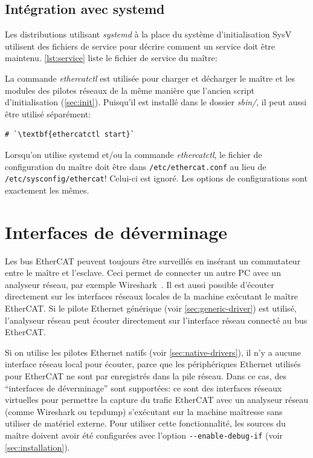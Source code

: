 \documentclass[a4paper,12pt,BCOR=6mm,bibtotoc,idxtotoc]{scrbook}
\begin{document}
\subsection{Int\'egration avec systemd}
\label{sec:systemd}

Les distributions utilisant \textit{systemd} \`a la place du syst\`eme
d'initialisation SysV utilisent des fichiers de service pour d\'ecrire
comment un service doit \^etre maintenu.  \autoref{lst:service} liste
le fichier de service du ma\^itre:



La commande \textit{ethercatctl} est utilis\'ee pour charger et
d\'echarger le ma\^itre et les modules des pilotes r\'eseaux de la
m\^eme mani\`ere que l'ancien script d'initialisation
(\autoref{sec:init}). Puisqu'il est install\'e dans le dossier
\textit{sbin/}, il peut aussi \^etre utilis\'e s\'epar\'ement:

\begin{lstlisting}[gobble=2]
  # `\textbf{ethercatctl start}`
\end{lstlisting}

Lorsqu'on utilise systemd et/ou la commande \textit{ethercatctl}, le
fichier de configuration du ma\^itre doit \^etre dans
\texttt{/etc/ethercat.conf} au lieu de
\texttt{/etc/sysconfig/ethercat}!  Celui-ci est ignor\'e. Les options
de configurations sont exactement les m\^emes.


\section{Interfaces de d\'everminage}
\label{sec:debug}

Les bus EtherCAT peuvent toujours \^etre surveill\'es en ins\'erant un
commutateur entre le ma\^itre et l'esclave. Ceci permet de connecter
un autre PC avec un analyseur r\'eseau, par exemple
Wireshark~\cite{wireshark}.  Il est aussi possible d'\'ecouter
directement sur les interfaces r\'eseaux locales de la machine
ex\'ecutant le ma\^itre EtherCAT.  Si le pilote Ethernet g\'en\'erique
(voir \autoref{sec:generic-driver}) est utilis\'e, l'analyseur
r\'eseau peut \'ecouter directement sur l'interface r\'eseau
connect\'e au bus EtherCAT.

Si on utilise les pilotes Ethernet natifs (voir
\autoref{sec:native-drivers}), il n'y a aucune interface r\'eseau
local pour \'ecouter, parce que les p\'eriph\'eriques Ethernet
utilis\'es pour EtherCAT ne sont par enregistr\'es dans la pile
r\'eseau.  Dans ce cas, des ``interfaces de d\'everminage'' sont
support\'ees: ce sont des interfaces r\'eseaux virtuelles pour
permettre la capture du trafic EtherCAT avec un analyseur r\'eseau
(comme Wireshark ou tcpdump) s'ex\'ecutant sur la machine ma\^itresse
sans utiliser de mat\'eriel externe.  Pour utiliser cette
fonctionnalit\'e, les sources du ma\^itre doivent avoir \'et\'e
configur\'ees avec l'option \lstinline+--enable-debug-if+ (voir
\autoref{sec:installation}).
\end{document}
